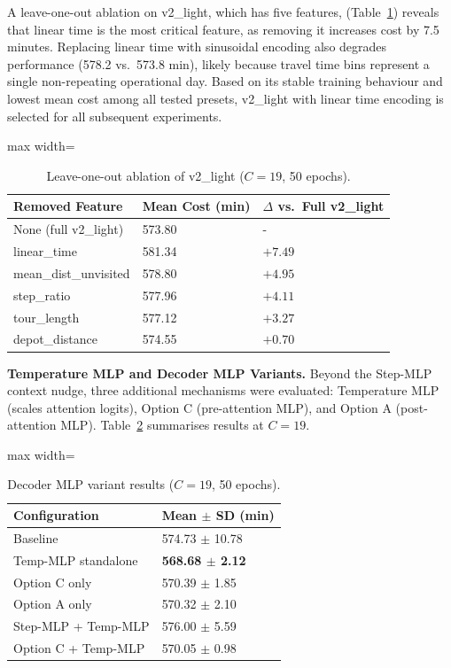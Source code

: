 A leave-one-out ablation on v2\_light, which has five features, (Table~\ref{tab:ablation_v2light})
reveals that linear time is the most critical feature, as removing it increases cost by 7.5
minutes. Replacing linear time with sinusoidal encoding also degrades performance (578.2 vs.\
573.8 min), likely because travel time bins represent a single non-repeating operational day.
Based on its stable training behaviour and lowest mean cost among all tested presets, v2\_light
with linear time encoding is selected for all subsequent experiments.

\begin{table}[H]
\centering
\caption{Leave-one-out ablation of v2\_light ($C = 19$, 50 epochs).}
\label{tab:ablation_v2light}
\begin{adjustbox}{max width=\textwidth}
\begin{tabular}{lll}
\toprule
\textbf{Removed Feature} & \textbf{Mean Cost (min)} & \textbf{$\Delta$ vs.\ Full v2\_light} \\
\midrule
None (full v2\_light)  & 573.80 & - \\
linear\_time           & 581.34 & $+7.49$ \\
mean\_dist\_unvisited  & 578.80 & $+4.95$ \\
step\_ratio            & 577.96 & $+4.11$ \\
tour\_length           & 577.12 & $+3.27$ \\
depot\_distance        & 574.55 & $+0.70$ \\
\bottomrule
\end{tabular}
\end{adjustbox}
\end{table}

\textbf{Temperature MLP and Decoder MLP Variants.} Beyond the Step-MLP context nudge, three additional mechanisms were evaluated: Temperature
MLP (scales attention logits), Option C (pre-attention MLP), and Option A (post-attention
MLP). Table~\ref{tab:decoder_mlp_c19} summarises results at $C = 19$.

\begin{table}[H]
\centering
\caption{Decoder MLP variant results ($C = 19$, 50 epochs).}
\label{tab:decoder_mlp_c19}
\begin{adjustbox}{max width=\textwidth}
\begin{tabular}{ll}
\toprule
\textbf{Configuration} & \textbf{Mean $\pm$ SD (min)} \\
\midrule
Baseline             & 574.73 $\pm$ 10.78 \\
Temp-MLP standalone  & \textbf{568.68 $\pm$ 2.12} \\
Option C only        & 570.39 $\pm$ 1.85 \\
Option A only        & 570.32 $\pm$ 2.10 \\
Step-MLP + Temp-MLP  & 576.00 $\pm$ 5.59 \\
Option C + Temp-MLP  & 570.05 $\pm$ 0.98 \\
\bottomrule
\end{tabular}
\end{adjustbox}
\end{table}

